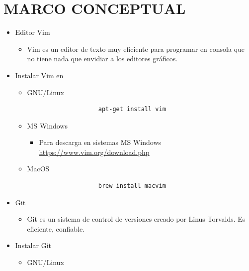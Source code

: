\documentclass{article}
\begin{document}
	\section{MARCO CONCEPTUAL}
	\begin{itemize}
		\item Editor Vim
        \begin{itemize}
            \item Vim es un editor de texto muy eficiente para programar en consola que no tiene nada que envidiar a los editores gráficos.
        \end{itemize}
        \item Instalar Vim en
        \begin{itemize}
            \item GNU/Linux
            \begin{itemize}
                \begin{lstlisting}
                    apt-get install vim
                \end{lstlisting}
            \end{itemize}
            \item MS Windows
            \begin{itemize}
                \item Para descarga en sistemas MS Windows \url{https://www.vim.org/download.php}
            \end{itemize}
            \item MacOS
            \begin{itemize}
                \begin{lstlisting}
                    brew install macvim
                \end{lstlisting}
            \end{itemize}
        \end{itemize}
        \item Git
        \begin{itemize}
            \item Git es un sistema de control de versiones creado por Linus Torvalds. Es eficiente, confiable.
        \end{itemize}
        \item Instalar Git
        \begin{itemize}
            \item GNU/Linux
            \begin{itemize}
                \begin{lstlisting}

\end{lstlisting}
\end{itemize}
\end{itemize}
\end{itemize}
\end{document}
